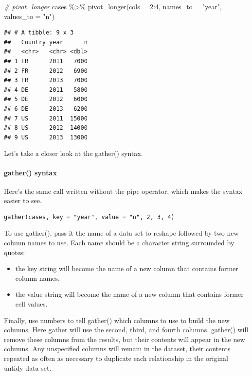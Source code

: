 \documentclass[
]{article}
\newenvironment{Shaded}{\begin{snugshade}}{\end{snugshade}}
\newcommand{\AttributeTok}[1]{\textcolor[rgb]{0.77,0.63,0.00}{#1}}
\newcommand{\CommentTok}[1]{\textcolor[rgb]{0.56,0.35,0.01}{\textit{#1}}}
\newcommand{\DecValTok}[1]{\textcolor[rgb]{0.00,0.00,0.81}{#1}}
\newcommand{\FunctionTok}[1]{\textcolor[rgb]{0.00,0.00,0.00}{#1}}
\newcommand{\NormalTok}[1]{#1}
\newcommand{\SpecialCharTok}[1]{\textcolor[rgb]{0.00,0.00,0.00}{#1}}
\newcommand{\StringTok}[1]{\textcolor[rgb]{0.31,0.60,0.02}{#1}}
\providecommand{\tightlist}{%
  \setlength{\itemsep}{0pt}\setlength{\parskip}{0pt}}
\begin{document}
\begin{Shaded}
\begin{Highlighting}[]
\CommentTok{\# pivot\_longer}
\NormalTok{cases }\SpecialCharTok{\%\textgreater{}\%} \FunctionTok{pivot\_longer}\NormalTok{(}\AttributeTok{cols =} \DecValTok{2}\SpecialCharTok{:}\DecValTok{4}\NormalTok{, }\AttributeTok{names\_to =} \StringTok{"year"}\NormalTok{, }\AttributeTok{values\_to =} \StringTok{"n"}\NormalTok{)}
\end{Highlighting}
\end{Shaded}

\begin{verbatim}
## # A tibble: 9 x 3
##   Country year      n
##   <chr>   <chr> <dbl>
## 1 FR      2011   7000
## 2 FR      2012   6900
## 3 FR      2013   7000
## 4 DE      2011   5800
## 5 DE      2012   6000
## 6 DE      2013   6200
## 7 US      2011  15000
## 8 US      2012  14000
## 9 US      2013  13000
\end{verbatim}

Let's take a closer look at the gather() syntax.

\hypertarget{gather-syntax}{%
\paragraph{gather() syntax}\label{gather-syntax}}

Here's the same call written without the pipe operator, which makes the
syntax easier to see.

\begin{verbatim}
gather(cases, key = "year", value = "n", 2, 3, 4)
\end{verbatim}

To use gather(), pass it the name of a data set to reshape followed by
two new column names to use. Each name should be a character string
surrounded by quotes:

\begin{itemize}
\tightlist
\item
  the key string will become the name of a new column that contains
  former column names.
\item
  the value string will become the name of a new column that contains
  former cell values.
\end{itemize}

Finally, use numbers to tell gather() which columns to use to build the
new columns. Here gather will use the second, third, and fourth columns.
gather() will remove these columns from the results, but their contents
will appear in the new columns. Any unspecified columns will remain in
the dataset, their contents repeated as often as necessary to duplicate
each relationship in the original untidy data set.
\end{document}
